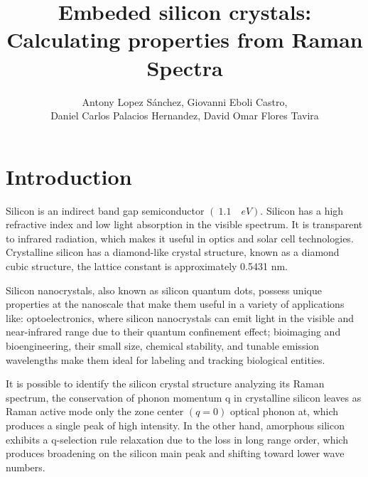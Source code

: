 \documentclass[a4paper,10pt,twocolumn]{article}
\title{Embeded silicon crystals: Calculating properties from Raman Spectra}
\author{Antony Lopez Sánchez, Giovanni Eboli Castro, \\ Daniel Carlos Palacios Hernandez, David Omar Flores Tavira}
\begin{document}

\section{Introduction}

Silicon is an indirect band gap semiconductor $ (~1.1 \quad eV) $. Silicon has a high refractive index and low light absorption in the visible spectrum. It is transparent to infrared radiation, which makes it useful in optics and solar cell technologies. Crystalline silicon has a diamond-like crystal structure, known as a diamond cubic structure, the lattice constant is approximately 0.5431 nm.

Silicon nanocrystals, also known as silicon quantum dots, possess unique properties at the nanoscale that make them useful in a variety of applications like: optoelectronics, where silicon nanocrystals can emit light in the visible and near-infrared range due to their quantum confinement effect; bioimaging and bioengineering, their small size, chemical stability, and tunable emission wavelengths make them ideal for labeling and tracking biological entities.

It is possible to identify the silicon crystal structure analyzing its Raman spectrum, the conservation of phonon momentum q in crystalline silicon leaves as Raman active mode only the zone center $(q=0) $ optical phonon at, which produces a single peak of high intensity. In the other hand, amorphous silicon exhibits a q-selection rule relaxation due to the loss in long range order, which produces broadening on the silicon main peak and shifting toward lower wave numbers.
\end{document}
